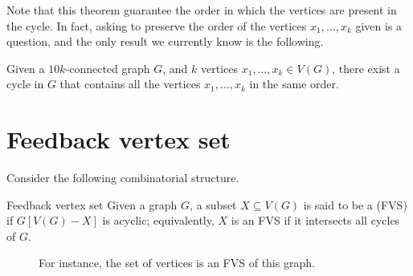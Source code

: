 \documentclass[a4paper, 12pt]{report}
\begin{document}
    Note that this theorem  guarantee the order in which the vertices are present in the cycle. In fact, asking to preserve the order of the vertices $x_1, \ldots, x_k$ given is a  question, and the only result we currently know is the following.

    \begin{framedthm}{}
        Given a $10k$-connected graph $G$, and $k$ vertices $x_1, \ldots, x_k \in V(G)$, there exist a cycle in $G$ that contains all the vertices $x_1, \ldots, x_k$ in the same order.
    \end{framedthm}

    \section{Feedback vertex set}

    Consider the following combinatorial structure.

    \begin{frameddefn}{Feedback vertex set}
        Given a graph $G$, a subset $X \subseteq V(G)$ is said to be a  (FVS) if $G[V(G) - X]$ is acyclic; equivalently, $X$ is an FVS if it intersects all cycles of $G$.
    \end{frameddefn}

    \begin{figure}[H]
        \centering
        \caption{For instance, the  set of vertices is an FVS of this graph.}
    \end{figure}
\end{document}
